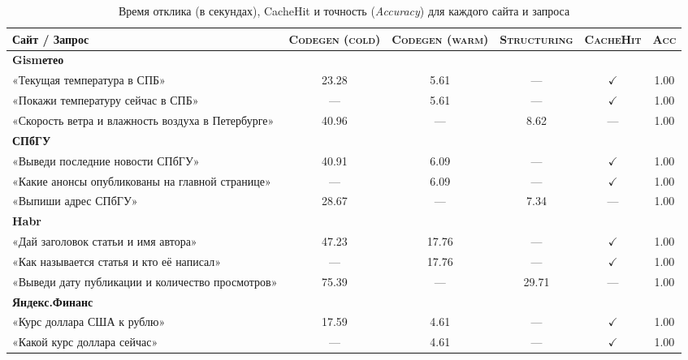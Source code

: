 \begin{sidewaystable}
    \def\arraystretch{1.1}
    \setlength\tabcolsep{0.7em}
    \centering
    \scriptsize
    \caption{Время отклика (в секундах), CacheHit и точность (\emph{Accuracy}) для каждого сайта и запроса}
    \begin{tabular}{p{5cm} c c c c c}
        \toprule
        \multicolumn{1}{l}{Сайт / Запрос} &
        \multicolumn{1}{c}{\textsc{Codegen (cold)}} &
        \multicolumn{1}{c}{\textsc{Codegen (warm)}} &
        \multicolumn{1}{c}{\textsc{Structuring}} &
        \multicolumn{1}{c}{\textsc{CacheHit}} &
        \multicolumn{1}{c}{\textsc{Acc}} \\
        \midrule
        \textbf{Gismетео} & & & & & \\
        «Текущая температура в СПБ»                      & 23.28  & 5.61  & —    & $\checkmark$   & 1.00 \\
        «Покажи температуру сейчас в СПБ»                & —      & 5.61  & —    & $\checkmark$   & 1.00 \\
        «Скорость ветра и влажность воздуха в Петербурге» & 40.96  & —     & 8.62 & —              & 1.00 \\
        \midrule
        \textbf{СПбГУ} & & & & & \\
        «Выведи последние новости СПбГУ»                  & 40.91  & 6.09  & —    & $\checkmark$   & 1.00 \\
        «Какие анонсы опубликованы на главной странице»    & —      & 6.09  & —    & $\checkmark$   & 1.00 \\
        «Выпиши адрес СПбГУ»                              & 28.67  & —     & 7.34 & —              & 1.00 \\
        \midrule
        \textbf{Habr} & & & & & \\
        «Дай заголовок статьи и имя автора»               & 47.23  & 17.76 & —    & $\checkmark$   & 1.00 \\
        «Как называется статья и кто её написал»           & —      & 17.76 & —    & $\checkmark$   & 1.00 \\
        «Выведи дату публикации и количество просмотров»   & 75.39  & —     & 29.71 & —             & 1.00 \\
        \midrule
        \textbf{Яндекс.Финанс} & & & & & \\
        «Курс доллара США к рублю»                        & 17.59  & 4.61  & —    & $\checkmark$   & 1.00 \\
        «Какой курс доллара сейчас»                       & —      & 4.61  & —    & $\checkmark$   & 1.00 \\

\end{tabular}
\end{sidewaystable}
